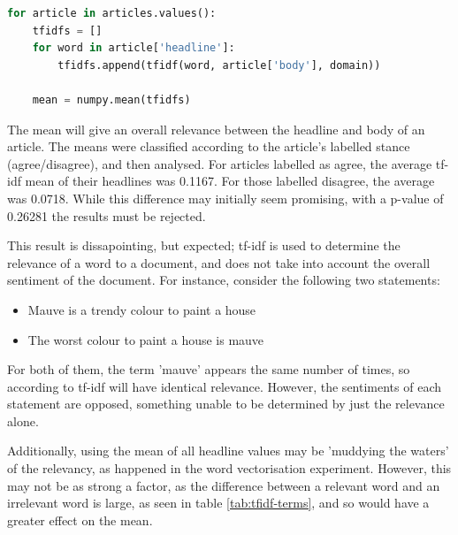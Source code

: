 \begin{lstlisting}[language=Python]
for article in articles.values():
    tfidfs = []
    for word in article['headline']:
        tfidfs.append(tfidf(word, article['body'], domain))

    mean = numpy.mean(tfidfs)
\end{lstlisting}

The mean will give an overall relevance between the headline and body of an article. The means were classified according to the article's labelled stance (agree/disagree), and then analysed. For articles labelled as agree, the average tf-idf mean of their headlines was 0.1167. For those labelled disagree, the average was 0.0718. While this difference may initially seem promising, with a p-value of 0.26281 the results must be rejected.

This result is dissapointing, but expected; tf-idf is used to determine the relevance of a word to a document, and does not take into account the overall sentiment of the document. For instance, consider the following two statements:

\begin{itemize}
	\item Mauve is a trendy colour to paint a house
	\item The worst colour to paint a house is mauve
\end{itemize}

For both of them, the term 'mauve' appears the same number of times, so according to tf-idf will have identical relevance. However, the sentiments of each statement are opposed, something unable to be determined by just the relevance alone. 

Additionally, using the mean of all headline values may be 'muddying the waters' of the relevancy, as happened in the word vectorisation experiment. However, this may not be as strong a factor, as the difference between a relevant word and an irrelevant word is large, as seen in table \ref{tab:tfidf-terms}, and so would have a greater effect on the mean.

